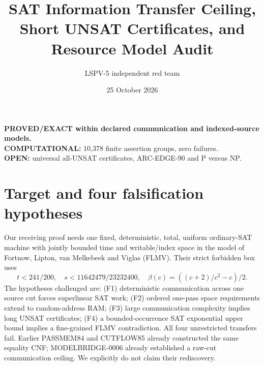 \documentclass[11pt]{article}
\title{SAT Information Transfer Ceiling, Short UNSAT Certificates, and Resource Model Audit}
\author{LSPV-5 independent red team}
\date{25 October 2026}
\begin{document}
\maketitle
\begin{center}\textbf{PROVED/EXACT within declared communication and indexed-source models.}\\
\textbf{COMPUTATIONAL:} 10,378 finite assertion groups, zero failures.\\
\textbf{OPEN:} universal all-UNSAT certificates, ARC-EDGE-90 and P versus NP.
\end{center}
\section{Target and four falsification hypotheses}
Our receiving proof needs one fixed, deterministic, total, uniform ordinary-SAT machine with jointly bounded time and writable/index space in the model of Fortnow, Lipton, van Melkebeek and Viglas (FLMV). Their strict forbidden box uses
\[t<241/200,\quad s<11642479/23232400,\quad\beta(c)=((c+2)/c^2-c)/2.\]
The hypotheses challenged are: (F1) deterministic communication across one source cut forces superlinear SAT work; (F2) ordered one-pass space requirements extend to random-address RAM; (F3) large communication complexity implies long UNSAT certificates; (F4) a bounded-occurrence SAT exponential upper bound implies a fine-grained FLMV contradiction. All four unrestricted transfers fail. Earlier PASSMEM84 and CUTFLOW85 already constructed the same equality CNF; MODELBRIDGE-0006 already established a raw-cut communication ceiling. We explicitly do not claim their rediscovery.
\end{document}
